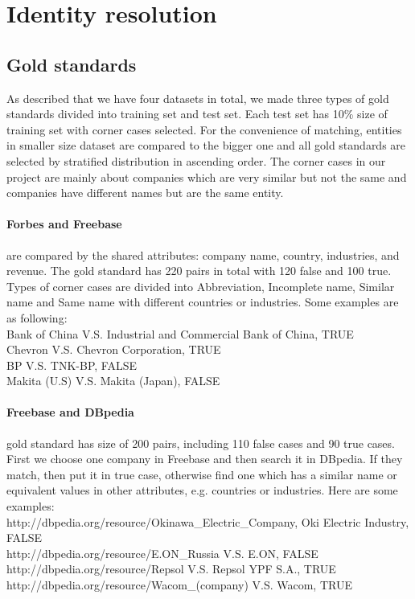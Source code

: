 \section{Identity resolution}
\subsection{Gold standards}
As described that we have four datasets in total, we made three types of gold standards divided into training set and test set. Each test set has 10\% size of training set with corner cases selected. For the convenience of matching, entities in smaller size dataset are compared to the bigger one and all gold standards are selected by stratified distribution in ascending order. The corner cases in our project are mainly about companies which are very similar but not the same and companies have different names but are the same entity.
\paragraph{Forbes and Freebase} are compared by the shared attributes: company name, country, industries, and revenue. The gold standard has 220 pairs in total with 120 false and 100 true. Types of corner cases are divided into Abbreviation, Incomplete name, Similar name and Same name with different countries or industries. Some examples are as following:\\
Bank of China V.S. Industrial and Commercial Bank of China, TRUE \\
Chevron V.S. Chevron Corporation, TRUE  \\
BP V.S. TNK-BP, FALSE \\
Makita (U.S) V.S. Makita (Japan), FALSE
\paragraph{Freebase and DBpedia} gold standard has size of 200 pairs, including 110 false cases and 90 true cases. First we choose one company in Freebase and then search it in DBpedia. If they match, then put it in true case, otherwise find one which has a similar name or equivalent values in other attributes, e.g. countries or industries. Here are some examples: \\
http://dbpedia.org/resource/Okinawa\_Electric\_Company, Oki Electric Industry, FALSE\\
http://dbpedia.org/resource/E.ON\_Russia V.S. E.ON, FALSE\\
http://dbpedia.org/resource/Repsol V.S. Repsol YPF S.A., TRUE\\
http://dbpedia.org/resource/Wacom\_(company) V.S. Wacom, TRUE
